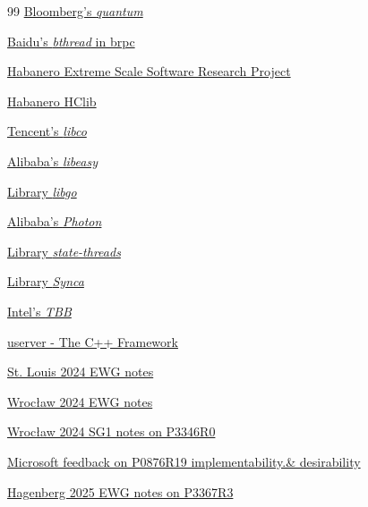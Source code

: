 \begin{thebibliography}{99}
        \href{https://github.com/bloomberg/quantum}
        {Bloomberg's \emph{quantum}}

        \href{https://brpc.apache.org/docs/bthread/}
        {Baidu's \emph{bthread} in brpc}

        \href{https://wiki.rice.edu/confluence/display/HABANERO/Habanero+Extreme+Scale+Software+Research+Project}
        {Habanero Extreme Scale Software Research Project}

        \href{https://github.com/habanero-rice/hclib}
        {Habanero HClib}

        \href{https://github.com/Tencent/libco}
        {Tencent's \emph{libco}}

        \href{https://github.com/oceanbase/oceanbase/tree/develop/deps/easy}
        {Alibaba's \emph{libeasy}}

        \href{https://github.com/yyzybb537/libgo}
        {Library \emph{libgo}}

        \href{https://github.com/alibaba/PhotonLibOS}
        {Alibaba's \emph{Photon}}

        \href{https://github.com/ossrs/state-threads}
        {Library \emph{state-threads}}

        \href{https://github.com/gridem/Synca}
        {Library \emph{Synca}}

        \href{https://github.com/intel/tbb}
        {Intel's \emph{TBB}}

        \href{https://github.com/userver-framework}
        {userver - The C++ Framework}

        \href{https://wiki.edg.com/bin/view/Wg21stlouis2024/NotesEWGP0876}
        {St. Louis 2024 EWG notes}

        \href{https://wiki.edg.com/bin/view/Wg21wroclaw2024/NotesEWGP0876}
        {Wrocław 2024 EWG notes}

        \href{https://wiki.edg.com/bin/edit/Wg21wroclaw2024/P3346R0?topicparent=Wg21wroclaw2024.SG1}
        {Wrocław 2024 SG1 notes on P3346R0}

        \href{https://lists.isocpp.org/ext/2025/02/25138.php}
        {Microsoft feedback on P0876R19 implementability.\& desirability}

        \href{https://wiki.edg.com/bin/edit/Wg21hagenberg2025/NotesEWGP3367}
        {Hagenberg 2025 EWG notes on P3367R3}

\end{thebibliography}
